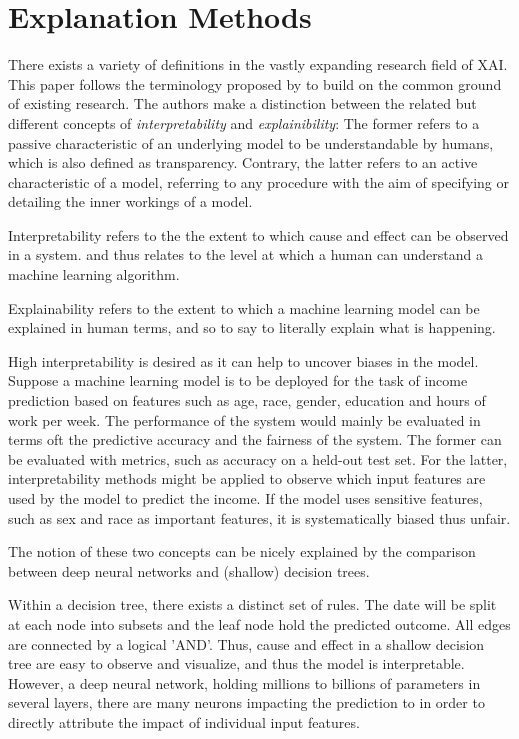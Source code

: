 \section{Explanation Methods}
\label{sec:explanation_methods}

There exists a variety of definitions in the vastly expanding research field of XAI. This paper follows the terminology proposed by \cite{arrieta2020explainable} to build on the common ground of existing research. The authors make a distinction between the related but different concepts of \textit{interpretability} and \textit{explainibility}: The former refers to a passive characteristic of an underlying model to be understandable by humans, which is also defined as transparency. Contrary, the latter refers to an active characteristic of a model, referring to any procedure with the aim of specifying or detailing the inner workings of a model. 

Interpretability refers to the the extent to which cause and effect can be observed in a system.   
and thus relates to the level at which a human can understand a machine learning algorithm.

Explainability refers to the extent to which a machine learning model can be explained in human terms, and so to say to literally explain what is happening. 

High interpretability is desired as it can help 
to uncover biases in the model. Suppose a machine learning model is to be deployed for the task of income prediction based on features such as age, race, gender, education and hours of work per week. The performance of the system would mainly be evaluated in terms oft the predictive accuracy and the fairness of the system. The former can be evaluated with metrics, such as accuracy on a held-out test set. For the latter, interpretability methods might be applied to observe which input features are used by the model to predict the income. 
If the model uses sensitive features, such as sex and race as important features, it is systematically biased thus unfair. 



The notion of these two concepts can be nicely explained by the comparison between deep neural networks and (shallow) decision trees. 

Within a decision tree, there exists a distinct set of rules. The date will be split at each node into subsets and the leaf node hold the predicted outcome. All edges are connected by a logical 'AND'. Thus, cause and effect in a shallow decision tree are easy to observe and visualize, and thus the model is interpretable. 
However, a deep neural network, holding millions to billions of parameters in several layers, there are many neurons impacting the prediction to in order to directly attribute the impact of individual input features.  

